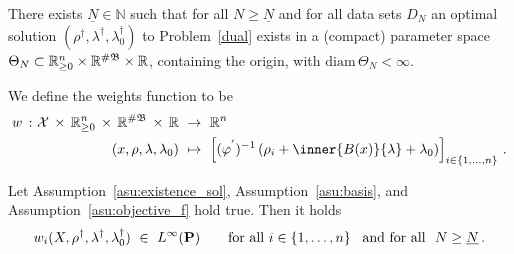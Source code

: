 \begin{assumption}
  \label{asu:existence_sol}
  There exists $\underline{N}\in\mathbb{N}$ such that 
  for all $N\ge \underline{N}$ and for all data sets $D_N$
  an optimal solution
  $(\rho^\dagger,\lambda^\dagger,\lambda_0^\dagger)$
  to Problem~\ref{dual} exists in a (compact) parameter space 
  $\Theta_N
  \subset
  \mathbb{R}^n_{\ge 0}
  \times
  \mathbb{R}^{\#\mathfrak{B}}
  \times
  \mathbb{R}
  $, containing the origin, with
  $\mathrm{diam}\,\Theta_N<\infty$.
\end{assumption}
\begin{definition}
  \label{def:weights_function}
  We define the weights function to be
\begin{align*}
  w
  \ 
  \colon
  \mathcal{X}
  \,
  \times
  \,
  \R^n_{\ge 0}
  \,
  \times
  \,
  \R^{\#\mathfrak{B}}
  \,
  \times
  \,
  \R
  &
  \ 
  \to
  \ 
  \R^n
  \\
  \left( 
  x
  ,
  \rho
  ,
  \lambda
  ,
  \lambda_0
  \right)
  &
  \ 
  \mapsto
  \ 
  \left[ 
    (
    \varphi^{'}
    )^{-1}
    \left( 
     \rho_i 
     +
      \inner{B(x)}{\lambda}
      +
      \lambda_0
    \right)
  \right]_{i\in \left\{ 1, \ldots,n \right\}}
    \,.
\end{align*}
\end{definition}
\begin{lemma}
  \label{weights_l_inf}
  Let Assumption~\ref{asu:existence_sol}, 
  Assumption~\ref{asu:basis},
  and Assumption~\ref{asu:objective_f} hold true.
  Then it holds 
  \begin{gather*}
  w_i(X,\rho^\dagger,\lambda^\dagger,\lambda_0^\dagger)
  \ 
  \in
  \ 
  L^\infty(\P)
  \qquad
  \text{for all}
  \ 
  i\in \left\{ 1,\ldots,n \right\}
  \ 
  \text{
    and
  for all 
  }\ 
  N\ge \underline{N}
  \,.
  \end{gather*}
\end{lemma}
